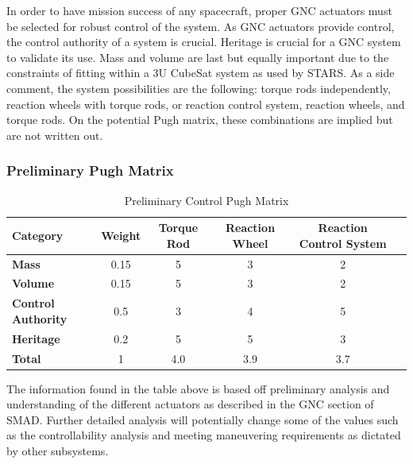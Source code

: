 In order to have mission success of any spacecraft, proper GNC actuators must be selected for robust control of the system. As GNC actuators provide control, the control authority of a system is crucial. Heritage is crucial for a GNC system to validate its use. Mass and volume are last but equally important due to the constraints of fitting within a 3U CubeSat system as used by STARS. As a side comment, the system possibilities are the following: torque rods independently, reaction wheels with torque rods, or reaction control system, reaction wheels, and torque rods. On the potential Pugh matrix, these combinations are implied but are not written out. 

\subsubsection{Preliminary Pugh Matrix}

\begin{table}[H]
\centering
\begin{tabular}{|l|c|c|c|c|c|} 
\hline
    \textbf{Category} & \textbf{Weight} & \textbf{Torque Rod} & \textbf{Reaction Wheel} & \textbf{Reaction Control System}
    \\
\hline
    \textbf{Mass} & 0.15 & 5 & 3 & 2
    \\
\hline
    \textbf{Volume} & 0.15 & 5 & 3 & 2 
    \\
\hline
    \textbf{Control Authority} & 0.5 & 3 & 4 & 5
    \\
\hline
    \textbf{Heritage} & 0.2 & 5 & 5 & 3
    \\
\hline
    \textbf{Total} & 1 & 4.0 & 3.9 & 3.7
    \\
\hline
\end{tabular}
\caption{Preliminary Control Pugh Matrix }
\label{tbl:Control_Pugh}
\end{table}
The information found in the table above is based off preliminary analysis and understanding of the different actuators as described in the GNC section of SMAD\cite{SMAD}. Further detailed analysis will potentially change some of the values such as the controllability analysis and meeting maneuvering requirements as dictated by other subsystems. 
